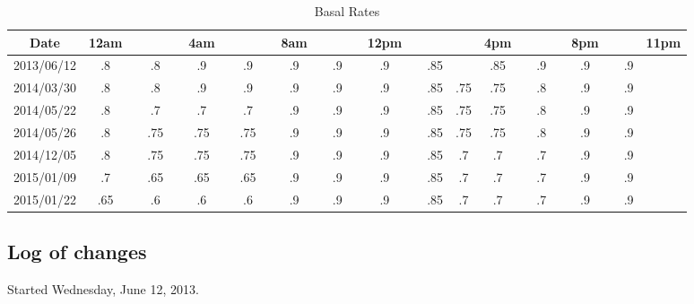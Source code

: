 \begin{table}[h]
\caption{Basal Rates}
\footnotesize
\begin{center}
\begin{tabular}{|c|c|c|c|c|c|c|c|c|c|c|c|c|c|c|c|c|c|c|c|c|c|c|c|c|}
\hline
Date       & 12am & &    & & 4am & &     & & 8am & &    & & 12pm & &     &     & 4pm & &    & & 8pm & &    & 11pm \\ \hline
2013/06/12 & .8   & & .8 & & .9  & & .9  & & .9  & & .9 & & .9   & & .85 &     & .85 & & .9 & & .9  & & .9 &      \\
2014/03/30 & .8   & & .8 & & .9  & & .9  & & .9  & & .9 & & .9   & & .85 & .75 & .75 & & .8 & & .9  & & .9 &      \\
2014/05/22 & .8   & & .7 & & .7  & & .7  & & .9  & & .9 & & .9   & & .85 & .75 & .75 & & .8 & & .9  & & .9 &      \\
2014/05/26 & .8   & & .75& & .75 & & .75 & & .9  & & .9 & & .9   & & .85 & .75 & .75 & & .8 & & .9  & & .9 &      \\
2014/12/05 & .8   & & .75& & .75 & & .75 & & .9  & & .9 & & .9   & & .85 & .7  & .7  & & .7 & & .9  & & .9 &      \\
2015/01/09 & .7   & & .65& & .65 & & .65 & & .9  & & .9 & & .9   & & .85 & .7  & .7  & & .7 & & .9  & & .9 &      \\
2015/01/22 & .65  & & .6 & & .6  & & .6  & & .9  & & .9 & & .9   & & .85 & .7  & .7  & & .7 & & .9  & & .9 &      \\
\hline
\end{tabular}
\end{center}
\label{default}
\end{table}%

\subsection{Log of changes}
Started Wednesday, June 12, 2013.

